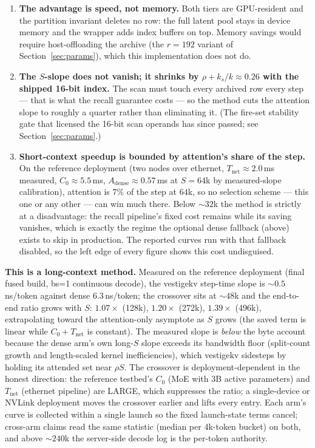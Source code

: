 \documentclass[11pt]{article}
\begin{document}
\begin{enumerate}
\item \textbf{The advantage is speed, not memory.} Both tiers are
GPU-resident and the partition invariant deletes no row: the full latent
pool stays in device memory and the wrapper adds index buffers on top.
Memory savings would require host-offloading the archive (the $r{=}192$
variant of Section~\ref{sec:params}), which this implementation does not do.
\item \textbf{The $S$-slope does not vanish; it shrinks by
$\rho + k_s/k \approx 0.26$ with the shipped 16-bit index.} The scan must
touch every archived row every step --- that is what the recall guarantee
costs --- so the method cuts the attention slope to roughly a quarter
rather than eliminating it. (The fire-set stability gate that licensed the
16-bit scan operands has since passed; see Section~\ref{sec:params}.)
\item \textbf{Short-context speedup is bounded by attention's share of the
step.} On the reference deployment (two nodes over ethernet,
$T_{\mathrm{net}} \approx 2.0$\,ms measured, $C_0 \approx 5.5$\,ms,
$A_{\mathrm{dense}} \approx 0.57$\,ms at $S{=}64$k by measured-slope
calibration), attention is $7\%$ of the step at $64$k, so no selection
scheme --- this one or any other --- can win much there. Below ${\sim}32$k
the method is strictly at a disadvantage: the recall pipeline's fixed cost
remains while its saving vanishes, which is exactly the regime the optional
dense fallback (above) exists to skip in production. The reported curves run
with that fallback disabled, so the left edge of every figure shows this
cost undisguised.
\end{enumerate}

\textbf{This is a long-context method.} Measured on the reference
deployment (final fused build, bs=1 continuous decode), the vestigekv
step-time slope is ${\sim}0.5$\,ns/token against dense $6.3$\,ns/token;
the crossover sits at ${\sim}48$k and the end-to-end ratio grows with $S$:
$1.07\times$ (128k), $1.20\times$ (272k), $1.39\times$ (496k), extrapolating
toward the attention-only asymptote as $S$ grows (the saved term is linear
while $C_0 + T_{\mathrm{net}}$ is constant). The measured slope is
\emph{below} the byte account because the dense arm's own long-$S$ slope
exceeds its bandwidth floor (split-count growth and length-scaled kernel
inefficiencies), which vestigekv sidesteps by holding its attended set near
$\rho S$. The crossover is deployment-dependent in the honest direction:
the reference testbed's $C_0$ (MoE with 3B active parameters) and
$T_{\mathrm{net}}$ (ethernet pipeline) are LARGE, which suppresses the
ratio; a single-device or NVLink deployment moves the crossover earlier and
lifts every entry. Each arm's curve is collected within a single launch so
the fixed launch-state terms cancel; cross-arm claims read the same
statistic (median per 4k-token bucket) on both, and above ${\sim}240$k the
server-side decode log is the per-token authority.
\end{document}
